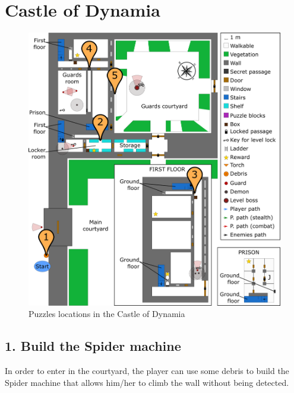 \section{Castle of Dynamia}

\begin{figure}[H]
  \centering
  \includegraphics[width=\textwidth]{Images/Maps/castleOfDynamiaPuzzles}
  \caption{Puzzles locations in the Castle of Dynamia}
\end{figure}

\subsection{1. Build the Spider machine}


In order to enter in the courtyard, the player can use some debris to build the Spider machine that allows him/her to climb the wall without being detected.


